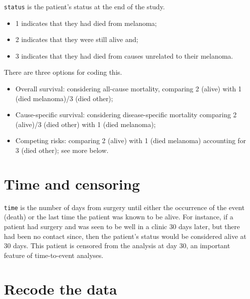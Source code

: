 \documentclass[
  12pt,
  krantz2]{krantz}
\providecommand{\tightlist}{%
  \setlength{\itemsep}{0pt}\setlength{\parskip}{0pt}}
\begin{document}
\texttt{status} is the patient's status at the end of the study.

\begin{itemize}
\tightlist
\item
  1 indicates that they had died from melanoma;
\item
  2 indicates that they were still alive and;
\item
  3 indicates that they had died from causes unrelated to their melanoma.
\end{itemize}

There are three options for coding this.

\begin{itemize}
\tightlist
\item
  Overall survival: considering all-cause mortality, comparing 2 (alive) with 1 (died melanoma)/3 (died other);
\item
  Cause-specific survival: considering disease-specific mortality comparing 2 (alive)/3 (died other) with 1 (died melanoma);
\item
  Competing risks: comparing 2 (alive) with 1 (died melanoma) accounting for 3 (died other); see more below.
\end{itemize}

\hypertarget{time-and-censoring}{%
\section{Time and censoring}\label{time-and-censoring}}

\texttt{time} is the number of days from surgery until either the occurrence of the event (death) or the last time the patient was known to be alive.
For instance, if a patient had surgery and was seen to be well in a clinic 30 days later, but there had been no contact since, then the patient's status would be considered alive at 30 days.
This patient is censored from the analysis at day 30, an important feature of time-to-event analyses.

\hypertarget{recode-the-data-1}{%
\section{Recode the data}\label{recode-the-data-1}}
\end{document}

